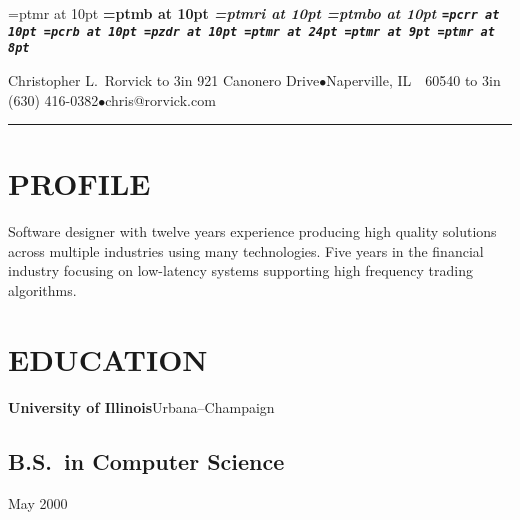 
\pdfpagewidth 8.5in
\pdfpageheight 11in
\pdfhorigin 1in
\pdfvorigin 1in

\nopagenumbers
\parindent=0pt

\font\rm=ptmr at 10pt
\font\bf=ptmb at 10pt
\font\it=ptmri at 10pt
\font\sl=ptmbo at 10pt
\font\tt=pcrr at 10pt
\font\tb=pcrb at 10pt
\font\zdb=pzdr at 10pt
\font\lgrm=ptmr at 24pt
\font\smrm=ptmr at 9pt
\font\superrm=ptmr at 8pt

\def\super#1{\lower -.5ex \hbox{\superrm #1}}
\def\xmrk{{\zdb 4}}

\rm

{\lgrm Christopher L.~Rorvick\hfill\vbox{\smrm
\hbox to 3in {\hfil
921 Canonero Drive\quad $\bullet$\quad Naperville, IL~~60540}
\hbox to 3in {\hfil
(630) 416-0382\quad $\bullet$\quad chris@rorvick.com}
}}

\vskip 5pt \hrule \vskip 10pt

\long{}
\long{}
\long{}
\def\bulleted#1#2{\setbox0=\hbox{#1\ }\hangindent=\wd0#1 #2}


\section{PROFILE}{%
Software designer with twelve years experience producing high quality
solutions across multiple industries using many technologies.
Five years in the financial industry focusing on low-latency systems
supporting high frequency trading algorithms.
}

\section{EDUCATION}{%
{\bf University of Illinois}\quad Urbana--Champaign\par
\subsection{B.S.~in Computer Science}
    {May 2000}
}

